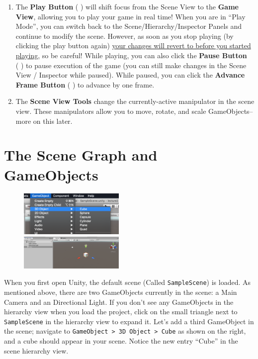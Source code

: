 \documentclass[11pt]{article}
\begin{document}
\begin{enumerate}
    \item The \textbf{Play Button} (\,\faPlay\,) will shift focus from the Scene View to the \textbf{Game View}, allowing you to play your game in real time!  When you are in ``Play Mode'', you can switch back to the Scene/Hierarchy/Inspector Panels and continue to modify the scene.  However, as soon as you stop playing (by clicking the play button again) \underline{your changes will revert to before you started playing}, so be careful!  While playing, you can also click the \textbf{Pause Button} (\,\faPause\,) to pause execution of the game (you can still make changes in the Scene View / Inspector while paused).  While paused, you can click the \textbf{Advance Frame Button} (\,\faFastForward\,) to advance by one frame.
    \item The \textbf{Scene View Tools} change the currently-active manipulator in the scene view.  These manipulators allow you to move, rotate, and scale GameObjects--more on this later.
\end{enumerate}

\section{The Scene Graph and GameObjects}

\begin{figure}
    \centering
    \includegraphics[width=0.45\textwidth]{cube-menu-item}\\
    \includegraphics[width=0.45\textwidth]{newcube}
\end{figure}

When you first open Unity, the default scene (Called \texttt{SampleScene}) is loaded.  As mentioned above, there are two GameObjects currently in the scene: a Main Camera and an Directional Light.  If you don't see any GameObjects in the hierarchy view when you load the project, click on the small triangle next to \texttt{SampleScene} in the hierarchy view to expand it.  Let's add a third GameObject in the scene; navigate to \texttt{GameObject > 3D Object > Cube} as shown on the right, and a cube should appear in your scene.  Notice the new entry ``Cube'' in the scene hierarchy view.
\end{document}
